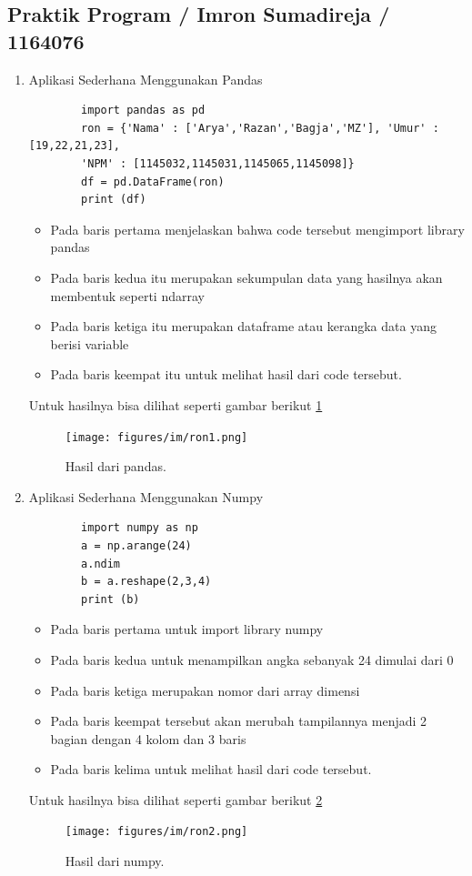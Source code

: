 \subsection{Praktik Program / Imron Sumadireja / 1164076}
\begin{enumerate}
\item Aplikasi Sederhana Menggunakan Pandas \par
	\begin{verbatim}
		import pandas as pd
		ron = {'Nama' : ['Arya','Razan','Bagja','MZ'], 'Umur' : [19,22,21,23], 
		'NPM' : [1145032,1145031,1145065,1145098]}
		df = pd.DataFrame(ron)
		print (df)
	\end{verbatim}
\begin{itemize}
\item Pada baris pertama menjelaskan bahwa code tersebut mengimport library pandas
\item Pada baris kedua itu merupakan sekumpulan data yang hasilnya akan membentuk seperti ndarray
\item Pada baris ketiga itu merupakan dataframe atau kerangka data yang berisi variable
\item Pada baris keempat itu untuk melihat hasil dari code tersebut.
\end{itemize}
Untuk hasilnya bisa dilihat seperti gambar berikut \ref{ron1}
		\begin{figure}[ht]
		\centerline{\texttt{[image: figures/im/ron1.png]}}
		\caption{Hasil dari pandas.}
		\label{ron1}
		\end{figure}

\item Aplikasi Sederhana Menggunakan Numpy \par
	\begin{verbatim}
		import numpy as np
		a = np.arange(24)
		a.ndim
		b = a.reshape(2,3,4)
		print (b)
	\end{verbatim}
\begin{itemize}
\item Pada baris pertama untuk import library numpy
\item Pada baris kedua untuk menampilkan angka sebanyak 24 dimulai dari 0
\item Pada baris ketiga merupakan nomor dari array dimensi
\item Pada baris keempat tersebut akan merubah tampilannya menjadi 2 bagian dengan 4 kolom dan 3 baris
\item Pada baris kelima untuk melihat hasil dari code tersebut.
\end{itemize}
Untuk hasilnya bisa dilihat seperti gambar berikut \ref{ron2}
		\begin{figure}[ht]
		\centerline{\texttt{[image: figures/im/ron2.png]}}
		\caption{Hasil dari numpy.}
		\label{ron2}
		\end{figure}


\end{enumerate}
